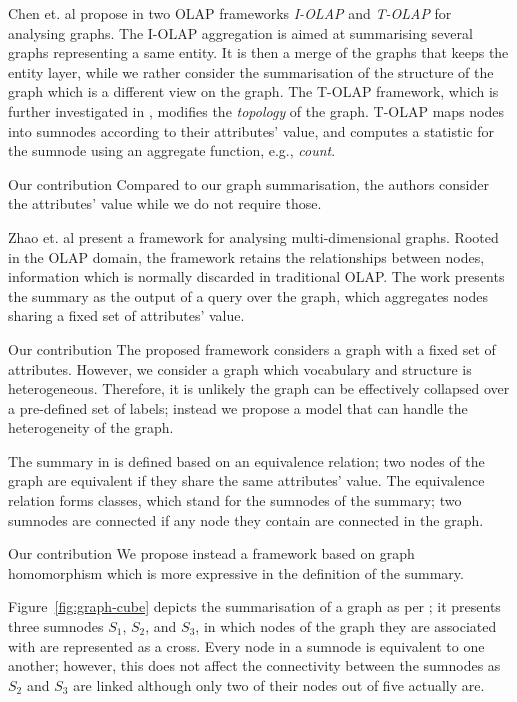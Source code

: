 Chen et. al propose in \cite{chen:icdm:2008} two OLAP frameworks \emph{I-OLAP} and \emph{T-OLAP} for analysing graphs. The I-OLAP aggregation is aimed at summarising several graphs representing a same entity. It is then a merge of the graphs that keeps the entity layer, while we rather consider the summarisation of the structure of the graph which is a different view on the graph. The T-OLAP framework, which is further investigated in \cite{qu:dasfaa:2011}, modifies the \emph{topology} of the graph. T-OLAP maps nodes into sumnodes according to their attributes' value, and computes a statistic for the sumnode using an aggregate function, e.g., \emph{count}.

\begin{centeremph}{Our contribution}
	Compared to our graph summarisation, the authors consider the attributes' value while we do not require those.
\end{centeremph}

Zhao et. al \cite{zhao:sigmod:2011} present a framework for analysing multi-dimensional graphs. Rooted in the OLAP domain, the framework retains the relationships between nodes, information which is normally discarded in traditional OLAP. The work presents the summary as the output of a query over the graph, which aggregates nodes sharing a fixed set of attributes' value.

\begin{centeremph}{Our contribution}
	The proposed framework considers a graph with a fixed set of attributes. However, we consider a graph which vocabulary and structure is heterogeneous. Therefore, it is unlikely the graph can be effectively collapsed over a pre-defined set of labels; instead we propose a model that can handle the heterogeneity of the graph.
\end{centeremph}

The summary in \cite{zhao:sigmod:2011} is defined based on an equivalence relation; two nodes of the graph are equivalent if they share the same attributes' value. The equivalence relation forms classes, which stand for the sumnodes of the summary; two sumnodes are connected if any node they contain are connected in the graph.

\begin{centeremph}{Our contribution}
	We propose instead a framework based on graph homomorphism which is more expressive in the definition of the summary.
\end{centeremph}

Figure~\ref{fig:graph-cube} depicts the summarisation of a graph as per \cite{zhao:sigmod:2011}; it presents three sumnodes $S_1$, $S_2$, and $S_3$, in which nodes of the graph they are associated with are represented as a cross. Every node in a sumnode is equivalent to one another; however, this does not affect the connectivity between the sumnodes as $S_2$ and $S_3$ are linked although only two of their nodes out of five actually are.

